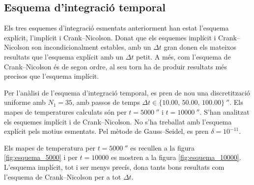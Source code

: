 
\subsection{Esquema d'integració temporal}

Els tres esquemes d'integració esmentats anteriorment han estat l'esquema explícit, l'implícit i Crank--Nicolson. Donat que els esquemes implícit i Crank--Nicolson son incondicionalment estables, amb un $\Delta t$ gran donen els mateixos resultats que l'esquema explícit amb un $\Delta t$ petit. A més, com l'esquema de Crank--Nicolson és de segon ordre, al seu torn ha de produir resultats més precisos que l'esquema implícit.

Per l'anàlisi de l'esquema d'integració temporal, es pren de nou una discretització uniforme amb $N_1 = 35$, amb passos de temps $\Delta t \in \{ 10.00, \, 50.00, \, 100.00 \} \ \second$. Els mapes de temperatures calculats són per $t = 5000 \ \second$ i $t = 10000 \ \second$. S'han analitzat els esquemes implícit i de Crank--Nicolson. No s'ha treballat amb l'esquema explícit pels motius esmentats. Pel mètode de Gauss--Seidel, es pren $\delta = 10^{-11}$. 

Els mapes de temperatura per $t = 5000 \ \second$ es recullen a la figura \ref{fig:esquema_5000} i per $t = 10000$ es mostren a la figura \ref{fig:esquema_10000}. L'esquema implícit, tot i ser menys precís, dona tants bons resultats com l'esquema de Crank--Nicolson per a tot $\Delta t$. 